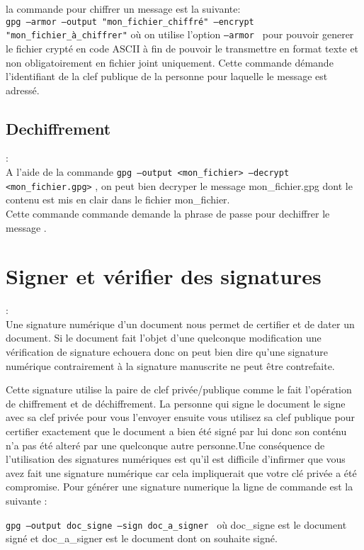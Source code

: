 la commande pour chiffrer un message est la suivante:\\
\texttt{gpg --armor --output "mon\_fichier\_chiffré" --encrypt "mon\_fichier\_à\_chiffrer"}
où on utilise l'option \texttt{--armor } pour pouvoir generer le fichier crypté en code ASCII à fin de pouvoir le transmettre en 
format texte et non obligatoirement en fichier joint uniquement.
Cette commande démande l'identifiant de la clef publique de la personne pour laquelle le message est adressé.


\subsection {Dechiffrement}:\\
A l'aide de la commande \texttt{gpg --output <mon\_fichier> --decrypt <mon\_fichier.gpg>} , on peut bien decryper le message 
mon\_fichier.gpg dont le contenu est mis en clair dans le fichier  mon\_fichier.\\

Cette commande commande demande la phrase de passe pour dechiffrer le message .


\section {Signer et vérifier des signatures} :\\

Une signature numérique d'un document nous permet de certifier et de dater un document. Si le document fait l'objet d'une quelconque
modification une vérification de signature echouera donc on peut bien dire qu'une signature numérique contrairement à la signature 
manuscrite ne peut être contrefaite.

Cette signature utilise la paire de clef privée/publique comme le fait l'opération de chiffrement et de déchiffrement.
La personne qui signe le document le signe avec sa clef privée pour vous l'envoyer ensuite vous utilisez sa clef publique
pour certifier exactement que le document a bien été signé par lui donc son conténu n'a pas été alteré par une quelconque 
autre personne.Une conséquence de l'utilisation des signatures numériques est qu'il est difficile d'infirmer que vous avez fait
une signature numérique car cela impliquerait que votre clé privée a été compromise.
Pour générer une signature numerique la ligne de commande est la suivante :

 \texttt{gpg --output doc\_signe --sign doc\_a\_signer } où doc\_signe est le document signé et doc\_a\_signer est le document 
 dont on souhaite signé.\\
 
